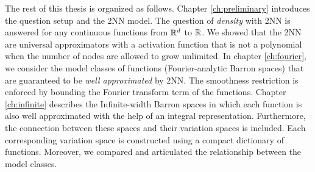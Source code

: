 The rest of this thesis is organized as follows. Chapter \ref{ch:preliminary}
introduces the question setup and the 2NN model. The question of
\textit{density} with 2NN is answered for any continuous functions from $\mathbb{R}^d$
to $\mathbb{R}$. We showed that the 2NN are universal approximators with a activation
function that is not a polynomial when the number of nodes are allowed to grow
unlimited. In chapter \ref{ch:fourier}, we consider the model classes of
functions (Fourier-analytic Barron spaces) that are guaranteed to be
\textit{well approximated} by 2NN. The smoothness restriction is enforced by
bounding the Fourier transform term of the functions. Chapter \ref{ch:infinite}
describes the Infinite-width Barron spaces in which each function is also well
approximated with the help of an integral representation. Furthermore, the
connection between these spaces and their variation spaces is included. Each
corresponding variation space is constructed using a compact dictionary of
functions. Moreover, we compared and articulated the relationship between the
model classes.

